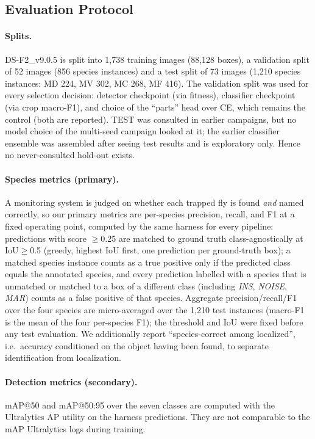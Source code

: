 \subsection{Evaluation Protocol}
\label{sec:method:protocol}

\paragraph{Splits.}
DS-F2\_v9.0.5 is split into 1{,}738 training images (88{,}128 boxes), a validation split of 52 images (856 species instances) and a test split of 73 images (1{,}210 species instances: MD 224, MV 302, MC 268, MF 416). The validation split was used for every selection decision: detector checkpoint (via fitness), classifier checkpoint (via crop macro-F1), and choice of the ``parts'' head over CE, which remains the control (both are reported). TEST was consulted in earlier campaigns, but no model choice of the multi-seed campaign looked at it; the earlier classifier ensemble was assembled after seeing test results and is exploratory only. Hence no never-consulted hold-out exists.

\paragraph{Species metrics (primary).}
A monitoring system is judged on whether each trapped fly is found \emph{and} named correctly, so our primary metrics are per-species precision, recall, and F1 at a fixed operating point, computed by the same harness for every pipeline: predictions with score $\ge$0.25 are matched to ground truth class-agnostically at IoU$\ge$0.5 (greedy, highest IoU first, one prediction per ground-truth box); a matched species instance counts as a true positive only if the predicted class equals the annotated species, and every prediction labelled with a species that is unmatched or matched to a box of a different class (including \emph{INS}, \emph{NOISE}, \emph{MAR}) counts as a false positive of that species. Aggregate precision/recall/F1 over the four species are micro-averaged over the 1{,}210 test instances (macro-F1 is the mean of the four per-species F1); the threshold and IoU were fixed before any test evaluation. We additionally report ``species-correct among localized'', i.e.\ accuracy conditioned on the object having been found, to separate identification from localization.

\paragraph{Detection metrics (secondary).}
mAP@50 and mAP@50:95 over the seven classes are computed with the Ultralytics AP utility on the harness predictions. They are not comparable to the mAP Ultralytics logs during training.


